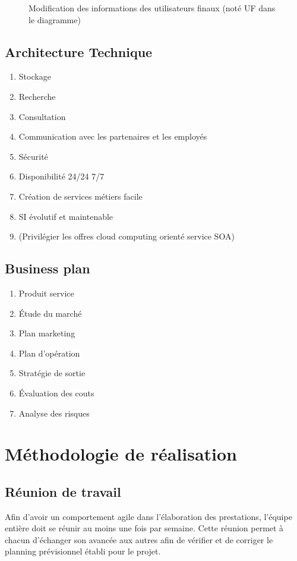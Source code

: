 \begin{figure}
  \caption{Modification des informations des utilisateurs finaux (noté UF dans le diagramme)}
\end{figure}

\subsection{Architecture Technique}
\begin{enumerate}
  \item Stockage
  \item Recherche
  \item Consultation
  \item Communication avec les partenaires et les employés
  \item Sécurité
  \item Disponibilité 24/24 7/7
  \item Création de services métiers facile
  \item SI évolutif et maintenable
  \item (Privilégier les offres cloud computing orienté service SOA)
\end{enumerate}

\subsection{Business plan}
\begin{enumerate}
  \item Produit service
  \item Étude du marché
  \item Plan marketing
  \item Plan d'opération
  \item Stratégie de sortie
  \item Évaluation des couts
  \item Analyse des risques
\end{enumerate}

\section{Méthodologie de réalisation}
\subsection{Réunion de travail}
Afin d'avoir un comportement agile dans l'élaboration des prestations, l'équipe
entière doit se réunir au moins une fois par semaine. Cette réunion permet à
chacun d'échanger son avancée aux autres afin de vérifier et de corriger le
planning prévisionnel établi pour le projet. \\

